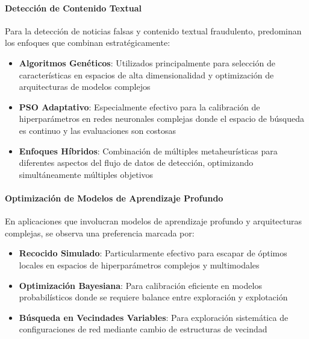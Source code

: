 \paragraph{Detección de Contenido Textual}
Para la detección de noticias falsas y contenido textual fraudulento, predominan los enfoques que combinan estratégicamente:
\begin{itemize}
    \item \textbf{Algoritmos Genéticos}: Utilizados principalmente para selección de características en espacios de alta dimensionalidad y optimización de arquitecturas de modelos complejos \cite{aqil2021modeling, hidayattullah2020financial}
    \item \textbf{PSO Adaptativo}: Especialmente efectivo para la calibración de hiperparámetros en redes neuronales complejas donde el espacio de búsqueda es continuo y las evaluaciones son costosas \cite{deshai2023unmasking, bacanin2023benefits}
    \item \textbf{Enfoques Híbridos}: Combinación de múltiples metaheurísticas para diferentes aspectos del flujo de datos de detección, optimizando simultáneamente múltiples objetivos \cite{yildirim2023novel}
\end{itemize}

\paragraph{Optimización de Modelos de Aprendizaje Profundo}
En aplicaciones que involucran modelos de aprendizaje profundo y arquitecturas complejas, se observa una preferencia marcada por:
\begin{itemize}
    \item \textbf{Recocido Simulado}: Particularmente efectivo para escapar de óptimos locales en espacios de hiperparámetros complejos y multimodales \cite{bacanin2023benefits}
    \item \textbf{Optimización Bayesiana}: Para calibración eficiente en modelos probabilísticos donde se requiere balance entre exploración y explotación \cite{horak2023gaussian}
    \item \textbf{Búsqueda en Vecindades Variables}: Para exploración sistemática de configuraciones de red mediante cambio de estructuras de vecindad \cite{kapunac2023variable}
\end{itemize}

